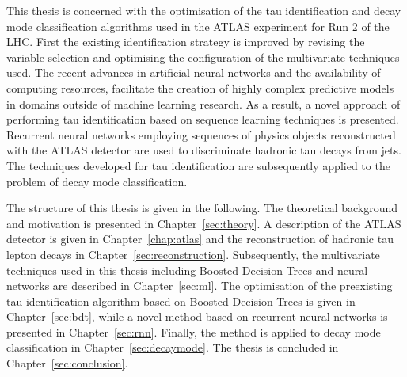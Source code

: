 This thesis is concerned with the optimisation of the tau identification and
decay mode classification algorithms used in the ATLAS experiment for Run 2 of
the LHC. First the existing identification strategy is improved by revising the
variable selection and optimising the configuration of the multivariate
techniques used. The recent advances in artificial neural networks and the
availability of computing resources, facilitate the creation of highly complex
predictive models in domains outside of machine learning research. As a result,
a novel approach of performing tau identification based on sequence learning
techniques is presented. Recurrent neural networks employing sequences of
physics objects reconstructed with the ATLAS detector are used to discriminate
hadronic tau decays from jets. The techniques developed for tau identification
are subsequently applied to the problem of decay mode classification.

The structure of this thesis is given in the following. The theoretical
background and motivation is presented in Chapter~\ref{sec:theory}. A
description of the ATLAS detector is given in Chapter~\ref{chap:atlas} and the
reconstruction of hadronic tau lepton decays in
Chapter~\ref{sec:reconstruction}. Subsequently, the multivariate techniques used
in this thesis including Boosted Decision Trees and neural networks are
described in Chapter~\ref{sec:ml}. The optimisation of the preexisting tau
identification algorithm based on Boosted Decision Trees is given in
Chapter~\ref{sec:bdt}, while a novel method based on recurrent neural networks
is presented in Chapter~\ref{sec:rnn}. Finally, the method is applied to decay
mode classification in Chapter~\ref{sec:decaymode}. The thesis is concluded in
Chapter~\ref{sec:conclusion}.


